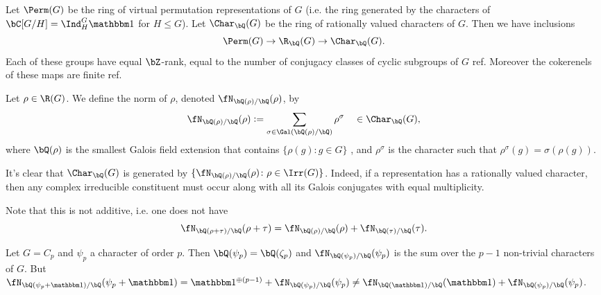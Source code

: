 Let $\Perm(G)$ be the ring of virtual permutation representations of $G$ (i.e. the ring generated by the characters of $\bC[G / H] = \Ind_{H}^G \trivial$ for $H \leq G$). Let $\Char_{\bQ}(G)$ be the ring of rationally valued characters of $G$. Then we have inclusions 
\[ \Perm(G) \to \R_{\bQ}(G) \to \Char_{\bQ}(G). \]
Each of these groups have equal $\bZ$-rank, equal to the number of conjugacy classes of cyclic subgroups of $G$ {\color{red} ref}. Moreover the cokerenels of these maps are finite {\color{red} ref}.

\begin{defn}\label{rho-norm}
    Let $\rho \in \R(G)$. We define the norm of $\rho$, denoted $\repnorm{\rho}$, by 
    \[
    \repnorm{\rho} \defeq \sum_{\sigma \in \Gal(\bQ(\rho)/\bQ)}  \rho^\sigma \quad \in \Char_{\bQ}(G),
    \]
    where $\bQ(\rho)$ is the smallest Galois field extension that contains $ \{\rho(g) \colon g \in G \}$ , and $\rho^\sigma$ is the character such that $\rho^\sigma(g) = \sigma(\rho(g))$.
\end{defn}

It's clear that $\Char_{\bQ}(G)$ is generated by $\{ \repnorm{\rho} \colon \rho \in \Irr(G) \}$. Indeed, if a representation has a rationally valued character, then any complex irreducible constituent must occur along with all its Galois conjugates with equal multiplicity.

Note that this is not additive, i.e. one does not have \[\repnorm{\rho + \tau} = \repnorm{\rho} + \repnorm{\tau}. \]  

\begin{example}
    Let $G = C_p$ and $\psi_p$ a character of order $p$. Then $\bQ(\psi_p) = \bQ(\zeta_p)$ and $\repnorm{\psi_p}$ is the sum over the $p - 1$ non-trivial characters of $G$. But $\repnorm{\psi_p + \trivial} = \trivial^{\oplus (p - 1)} + \repnorm{\psi_p} \not= \repnorm{\trivial} + \repnorm{\psi_p}$.
\end{example}



